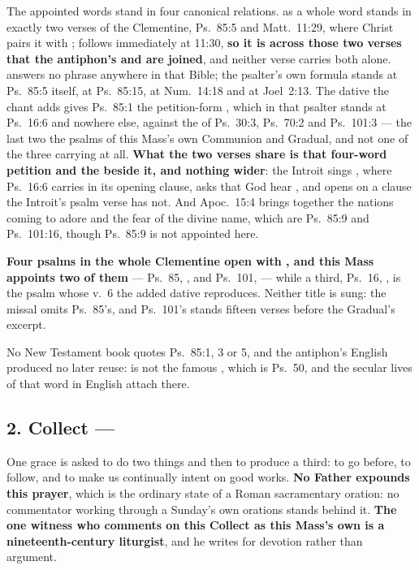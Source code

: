 The appointed words stand in four canonical relations.  as a whole
word stands in exactly two verses of the Clementine, Ps.~85:5 and Matt.~11:29,
where Christ pairs it with ; 
follows immediately at 11:30, \textbf{so it is across those two verses that the
antiphon's  and  are joined}, and neither verse
carries both alone.  answers no phrase anywhere
in that Bible; the psalter's own formula stands at Ps.~85:5 itself, at
Ps.~85:15, at Num.~14:18 and at Joel~2:13. The dative the chant adds gives
Ps.~85:1 the petition-form , which in that
psalter stands at Ps.~16:6 and nowhere else, against the  of Ps.~30:3, Ps.~70:2 and Ps.~101:3 --- the last two the psalms of
this Mass's own Communion and Gradual, and not one of the three carrying
 at all. \textbf{What the two verses share is that four-word
petition and the  beside it, and nothing wider}: the Introit
sings , where Ps.~16:6
carries  in its opening clause, asks that God hear ,
and opens on a clause the Introit's psalm verse has not. And Apoc.~15:4
brings together the nations coming to adore and the fear of the divine name,
which are Ps.~85:9 and Ps.~101:16, though Ps.~85:9 is not appointed here.

\textbf{Four psalms in the whole Clementine open with , and this
Mass appoints two of them} --- Ps.~85, , and Ps.~101,
 --- while a third, Ps.~16, , is the
psalm whose v.~6 the added dative reproduces. Neither title is sung: the missal
omits Ps.~85's, and Ps.~101's stands fifteen verses before the Gradual's excerpt.

No New Testament book quotes Ps.~85:1, 3 or 5, and the antiphon's English
produced no later reuse:  is not the famous
, which is Ps.~50, and the secular lives of that word in English
attach there.

\subsection*{2. Collect  --- }

One grace is asked to do two things and then to produce a third: to go before,
to follow, and to make us continually intent on good works. \textbf{No Father
expounds this prayer}, which is the ordinary state of a Roman sacramentary
oration: no commentator working through a Sunday's own orations stands behind
it. \textbf{The one witness who
comments on this Collect as this Mass's own is a nineteenth-century liturgist},
and he writes for devotion rather than argument.

